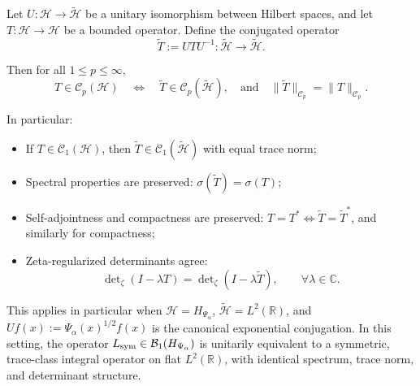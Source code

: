 \begin{lemma}
\label{lem:unitary_conjugation_trace_class}
Let \( U \colon \mathcal{H} \to \widetilde{\mathcal{H}} \) be a unitary isomorphism between Hilbert spaces, and let \( T \colon \mathcal{H} \to \mathcal{H} \) be a bounded operator. Define the conjugated operator
\[
\widetilde{T} := U T U^{-1} \colon \widetilde{\mathcal{H}} \to \widetilde{\mathcal{H}}.
\]

Then for all \( 1 \le p \le \infty \),
\[
T \in \mathcal{C}_p(\mathcal{H}) \quad \Longleftrightarrow \quad \widetilde{T} \in \mathcal{C}_p(\widetilde{\mathcal{H}}),
\quad \text{and} \quad
\| \widetilde{T} \|_{\mathcal{C}_p} = \| T \|_{\mathcal{C}_p}.
\]

\medskip
\noindent In particular:
\begin{itemize}
  \item If \( T \in \mathcal{C}_1(\mathcal{H}) \), then \( \widetilde{T} \in \mathcal{C}_1(\widetilde{\mathcal{H}}) \) with equal trace norm;
  \item Spectral properties are preserved: \( \sigma(\widetilde{T}) = \sigma(T) \);
  \item Self-adjointness and compactness are preserved: \( T = T^* \iff \widetilde{T} = \widetilde{T}^* \), and similarly for compactness;
  \item Zeta-regularized determinants agree:
  \[
  \det\nolimits_\zeta(I - \lambda T) = \det\nolimits_\zeta(I - \lambda \widetilde{T}), \qquad \forall \lambda \in \mathbb{C}.
  \]
\end{itemize}

\medskip
\noindent
This applies in particular when \( \mathcal{H} = H_{\Psi_\alpha} \), \( \widetilde{\mathcal{H}} = L^2(\mathbb{R}) \), and \( U f(x) := \Psi_\alpha(x)^{1/2} f(x) \) is the canonical exponential conjugation. In this setting, the operator \( L_{\mathrm{sym}} \in \mathcal{B}_1(H_{\Psi_\alpha}) \) is unitarily equivalent to a symmetric, trace-class integral operator on flat \( L^2(\mathbb{R}) \), with identical spectrum, trace norm, and determinant structure.
\end{lemma}
